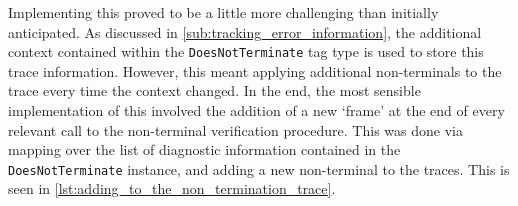 Implementing this proved to be a little more challenging than initially anticipated. 
As discussed in \autoref{sub:tracking_error_information}, the additional context contained within the \texttt{DoesNotTerminate} tag type is used to store this trace information.
However, this meant applying additional non-terminals to the trace every time the context changed.
In the end, the most sensible implementation of this involved the addition of a new `frame' at the end of every relevant call to the non-terminal verification procedure. 
This was done via mapping over the list of diagnostic information contained in the \texttt{DoesNotTerminate} instance, and adding a new non-terminal to the traces. 
This is seen in \autoref{lst:adding_to_the_non_termination_trace}.




